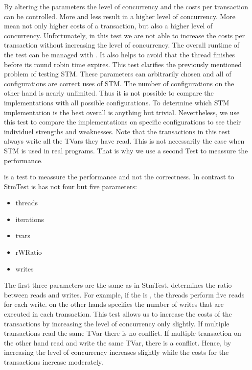 By altering the parameters the level of concurrency and the costs per transaction can be controlled. More  and less 
 result in a higher level of concurrency. More  mean not only higher costs of a transaction, but also
a higher level of concurrency. Unfortunately, in this test we are not able to increase the costs per transaction without increasing
the level of concurrency. The overall runtime of the test can be managed with . It also helps to avoid that the thread
finishes before its round robin time expires. This test clarifies the previously mentioned problem of testing STM. These parameters can 
arbitrarily chosen and all of configurations are correct uses of STM. The number of configurations on the other hand is nearly unlimited. Thus 
it is not possible to compare the implementations with all possible configurations. To determine which STM implementation is the best overall 
is anything but trivial.
Nevertheless, we use this test to compare the implementations on specific configurations to see their individuel strengths and weaknesses.
Note that the transactions in this test always write all the TVars they have read. This is not necessarily the case when STM is used in real programs. 
That is why we use a second Test to meassure the performance.

 is a test to meassure the performance and not the correctness. In contrast to StmTest is has not four but
five parameters:
\begin{itemize}
 \item threads
 \item iterations
 \item tvars
 \item rWRatio
 \item writes
\end{itemize}
The first three parameters are the same as in StmTest.  determines the ratio between reads and writes. For example, if
the  is , the threads perform five reads for each write.  on the other hands specifies
the number of writes that are executed in each transaction. This test allows us to increase the costs of the transactions by 
increasing the level of concurrency only slightly. If multiple transactions read the same TVar there is no conflict. If multiple
transaction on the other hand read and write the same TVar, there is a conflict. Hence, by increasing  the level of 
concurrency increases slightly while the costs for the transactions increase moderately.

